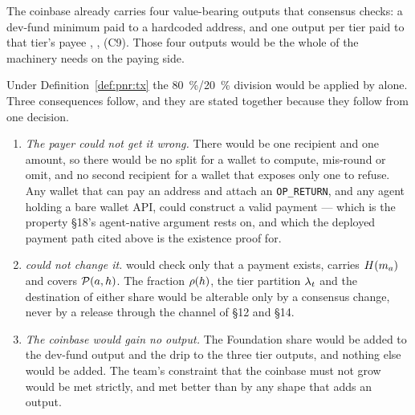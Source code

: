 The coinbase already carries four value-bearing outputs that consensus checks: a dev-fund minimum
paid to a hardcoded address, and one output per tier paid to that tier's \PoN payee \shipped
{}, ,
 (C9). Those four outputs would be the whole of
the machinery \PNR needs on the paying side.

\begin{property}
\label{prop:pnr:enforce}
Under Definition~\ref{def:pnr:tx} the \SI{80}{\percent}/\SI{20}{\percent} division would be applied
by \fluxd alone. Three consequences follow, and they are stated together because they follow from
one decision.
\begin{enumerate}
  \item[\textbf{E1}] \emph{The payer could not get it wrong.} There would be one recipient and one
    amount, so there would be no split for a wallet to compute, mis-round or omit, and no second
    recipient for a wallet that exposes only one to refuse. Any wallet that can pay an address and
    attach an \texttt{OP\_RETURN}, and any agent holding a bare wallet API, could construct a valid
    payment --- which is the property \S18's agent-native argument rests on, and which the deployed
    \CumulusVPN payment path cited above is the existence proof for.
  \item[\textbf{E2}] \emph{\FluxOS could not change it.} \FluxOS would check only that a payment
    exists, carries $H(m_{a})$ and covers $\mathcal{P}(a,h)$. The fraction $\rho(h)$, the
    tier partition $\lambda_{t}$ and the destination of either share would be alterable only by a
    consensus change, never by a \FluxOS release through the channel of \S12 and \S14.
  \item[\textbf{E3}] \emph{The coinbase would gain no output.} The Foundation share would be added
    to the dev-fund output and the drip to the three tier outputs, and nothing else would be added.
    The team's constraint that the coinbase must not grow 
    would be met strictly, and met better than by any shape that adds an output.
\end{enumerate}
\end{property}

